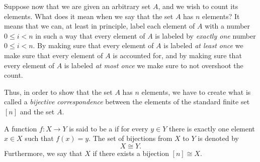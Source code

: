 Suppose now that we are given an arbitrary set $A$,
and we wish to count its elements.
What does it mean when we say that the set $A$ has $n$ elements?
It means that we can, at least in principle,
label each element of $A$ with a number $0\leq i<n$ in such a way that every element of $A$ is labeled by \emph{exactly one} number $0\leq i<n$.
By making sure that every element of $A$ is labeled \emph{at least once} we make sure that every element of $A$ is accounted for,
and by making sure that every element of $A$ is labeled \emph{at most once} we make sure to not overshoot the count.

Thus,
in order to show that the set $A$ has $n$ elements,
we have to create what is called a \emph{bijective correspondence} between the elements of the standard finite set $[n]$ and the set $A$.

\begin{definition}
  A function $f:X\to Y$ is said to be a  if for every $y\in Y$ there is exactly one element $x\in X$ such that $f(x)=y$.
  The set of bijections from $X$ to $Y$ is denoted by
  \begin{equation*}
    X\cong Y.
  \end{equation*}
  Furthermore, we say that $X$  if there exists a bijection $[n]\cong X$.
\end{definition}

